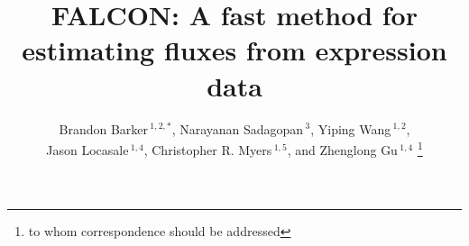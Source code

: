 \documentclass{bioinfo}
\begin{document}





\title[FALCON]{FALCON: A fast method for estimating fluxes
  from expression data} 
  \author[Barker \textit{et~al}]{Brandon Barker\,$^{1,2,*}$, 
    Narayanan Sadagopan\,$^{3}$, Yiping Wang\,$^{1,2}$, \\
    Jason Locasale\,$^{1,4}$, Christopher R. Myers\,$^{1,5}$, 
    and Zhenglong Gu\,$^{1,4}$
    \footnote{to whom correspondence should be addressed}
  }

\address{$^{1}$Tri-Institutional Training Program in Computational
  Biology and Medicine, 1300 York Avenue, Box 194, New York, NY 10065\\
  $^{2}$Department of Biological Statistics and Computational Biology, 
    Cornell University, 1198 Comstock Hall, Ithaca, NY 14853-2601\\
  $^{3}$College of Engineering, Cornell University, Carpenter Hall, 
    Ithaca, NY 14853-2201\\
  $^{4}$Division of Nutritional Sciences, Cornell University, 
    Savage Hall, Ithaca, NY 14853-2201\\
  $^{5}$ Life Sciences Core Laboratories Center, Cornell University, 
    Ithaca, NY 14853-2201\\
  $^{6}$ Laboratory of Atomic and Solid State Physics, Physical Sciences Building,
    Cornell University, Ithaca, NY 14853-2201\\}



\maketitle
\end{document}
